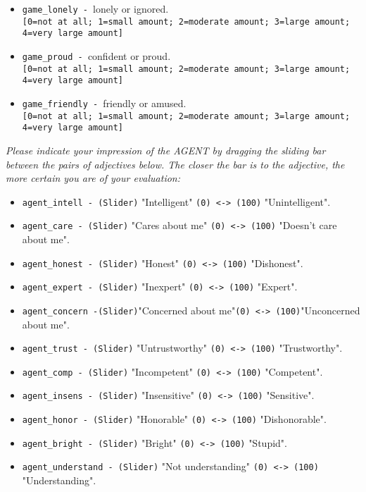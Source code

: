 \begin{description}
\begin{addmargin}[0em]{0em}
\begin{addmargin}[1em]{0em}
\begin{itemize}
            \item \verb|game_lonely - |lonely or ignored.\\\verb|[0=not at all; 1=small amount; 2=moderate amount; 3=large amount; 4=very large amount]|
            \item \verb|game_proud - |confident or proud.\\\verb|[0=not at all; 1=small amount; 2=moderate amount; 3=large amount; 4=very large amount]|
            \item \verb|game_friendly - |friendly or amused.\\\verb|[0=not at all; 1=small amount; 2=moderate amount; 3=large amount; 4=very large amount]|
        \end{itemize}
        \begin{addmargin}[1em]{0em}
            \textit{Please indicate your impression of the AGENT by dragging the sliding bar between the pairs of adjectives below. The closer the bar is to the adjective, the more certain you are of your evaluation:}
        \end{addmargin}
        \begin{itemize}
            \item \verb|agent_intell - (Slider)| "Intelligent" \verb|(0) <-> (100)| "Unintelligent".
            \item \verb|agent_care - (Slider)| "Cares about me" \verb|(0) <-> (100)| "Doesn't care about me".
            \item \verb|agent_honest - (Slider)| "Honest" \verb|(0) <-> (100)| "Dishonest".
            \item \verb|agent_expert - (Slider)| "Inexpert" \verb|(0) <-> (100)| "Expert".
            \item \verb|agent_concern -(Slider)|"Concerned about me"\verb|(0) <-> (100)|"Unconcerned about me".
            \item \verb|agent_trust - (Slider)| "Untrustworthy" \verb|(0) <-> (100)| "Trustworthy".
            \item \verb|agent_comp - (Slider)| "Incompetent" \verb|(0) <-> (100)| "Competent".
            \item \verb|agent_insens - (Slider)| "Insensitive" \verb|(0) <-> (100)| "Sensitive".
            \item \verb|agent_honor - (Slider)| "Honorable" \verb|(0) <-> (100)| "Dishonorable".
            \item \verb|agent_bright - (Slider)| "Bright" \verb|(0) <-> (100)| "Stupid".
            \item \verb|agent_understand - (Slider)| "Not understanding" \verb|(0) <-> (100)| "Understanding".

\end{itemize}
\end{addmargin}
\end{addmargin}
\end{description}
